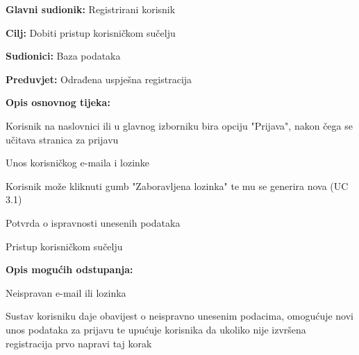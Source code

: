 					\noindent {}
					\begin{packed_item}
	
						\item \textbf{Glavni sudionik: } Registrirani korisnik
						\item  \textbf{Cilj:} Dobiti pristup korisničkom sučelju
						\item  \textbf{Sudionici:} Baza podataka
						\item  \textbf{Preduvjet:} Odrađena uspješna registracija
						\item  \textbf{Opis osnovnog tijeka:}
						
						\item[] \begin{packed_enum}

							\item Korisnik na naslovnici ili u glavnog izborniku bira opciju "Prijava", nakon čega se učitava stranica za prijavu
							\item Unos korisničkog e-maila i lozinke
							\item Korisnik može kliknuti gumb "Zaboravljena lozinka" te mu se generira nova (UC 3.1)
							\item Potvrda o ispravnosti unesenih podataka
							\item Pristup korisničkom sučelju
					
						\end{packed_enum}

						\item  \textbf{Opis mogućih odstupanja:}
						
						\item[] \begin{packed_item}
	
							\item[2.a]  Neispravan e-mail ili lozinka
							\item[] \begin{packed_enum}
								
								\item Sustav korisniku daje obavijest o neispravno unesenim podacima, omogućuje novi unos podataka za prijavu te upućuje korisnika da ukoliko nije izvršena registracija prvo napravi taj korak
								
							\end{packed_enum}
							
						\end{packed_item}
			
					\end{packed_item}
